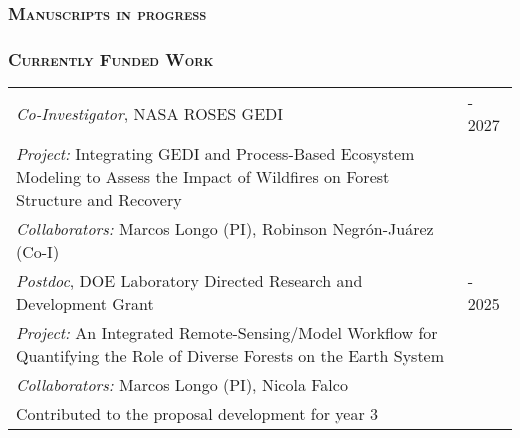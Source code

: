 \documentclass[10pt,english]{article}
\providecommand{\tabularnewline}{\\}
\begin{document}

\vspace{1ex}


\subsubsection*{\textsc{Manuscripts in progress}}

\setlength{\LTpre}{0pt}
\setlength{\LTpost}{2ex}
\setlength{\extrarowheight}{0.25ex}


\vspace{1ex}


\subsubsection*{\textsc{Currently Funded Work}}
\vspace{-0.5ex}

\renewcommand{\arraystretch}{1.2}
\begin{tabularx}{\textwidth}{@{}>{\raggedright}p{5in} >{\raggedleft}X@{}}

\emph{Co-Investigator}, NASA ROSES GEDI & 2024 - 2027 \tabularnewline
\addtolength{\leftskip}{5ex}\emph{Project:} Integrating GEDI and Process-Based Ecosystem Modeling to Assess the Impact of Wildfires on Forest Structure and Recovery & \tabularnewline
\addtolength{\leftskip}{5ex}\emph{Collaborators:} Marcos Longo (PI), Robinson Negr\'{o}n-Ju\'{a}rez (Co-I) & \tabularnewline

\emph{Postdoc}, DOE Laboratory Directed Research and Development Grant & 2022 - 2025 \tabularnewline
\addtolength{\leftskip}{5ex}\emph{Project:} An Integrated Remote-Sensing/Model Workflow for Quantifying the Role of Diverse Forests on the Earth System & \tabularnewline
\addtolength{\leftskip}{5ex}\emph{Collaborators:} Marcos Longo (PI), Nicola Falco & \tabularnewline
\addtolength{\leftskip}{5ex} Contributed to the proposal development for year 3 & \tabularnewline

\end{tabularx}

\vspace{1ex}

\end{document}

